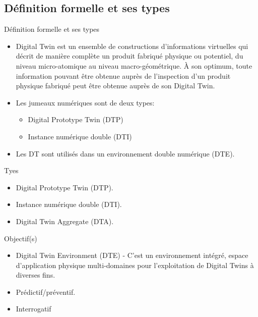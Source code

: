 \documentclass{beamer}
\begin{document}
   \subsection{Définition formelle et ses types}
 \begin{frame}{Définition formelle et ses types}
   \begin{itemize}
     \item Digital Twin est un ensemble de constructions d'informations virtuelles qui décrit de manière complète un produit fabriqué physique ou potentiel, du niveau micro-atomique au niveau macro-géométrique. À son optimum, toute information pouvant être obtenue auprès de l’inspection d’un produit physique fabriqué peut être obtenue auprès de son Digital Twin.
     \item Les jumeaux numériques sont de deux types:
       \begin{itemize}
         \item Digital Prototype Twin (DTP)
         \item Instance numérique double (DTI)
       \end{itemize}
     \item Les DT sont utilisés dans un environnement double numérique (DTE).
   \end{itemize}
  \end{frame}
 \begin{frame}{Tyes}
   \begin{itemize}
     \item Digital Prototype Twin (DTP).
     \item Instance numérique double (DTI).
     \item Digital Twin Aggregate (DTA).
   \end{itemize}
  \end{frame}
  \begin{frame}{Objectif(s)}
   \begin{itemize}
     \item Digital Twin Environment (DTE) - C’est un environnement intégré, espace d'application physique multi-domaines pour l'exploitation de Digital Twins à diverses fins.
     \item Prédictif/préventif.
     \item Interrogatif
   \end{itemize}
  \end{frame}
\end{document}
